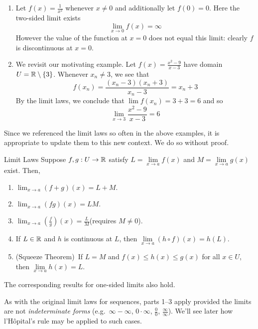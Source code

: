 \begin{examples}{}{}
\begin{enumerate}
	\item Let $f(x)=\frac 1{x^2}$ whenever $x\neq 0$ and additionally let $f(0)=0$. Here the two-sided limit exists
	\[\lim_{x\to 0}f(x)=\infty\]
	However the value of the function at $x=0$ does not equal this limit: clearly $f$ is discontinuous at $x=0$.
	
	\item We revisit our motivating example. Let $f(x)=\frac{x^2-9}{x-3}$ have domain $U=\mathbb{R}\setminus\{3\}$. Whenever $x_n\neq 3$, we see that
	\[f(x_n)=\frac{(x_n-3)(x_n+3)}{x_n-3}=x_n+3\]
	By the limit laws, we conclude that $\lim f(x_n)=3+3=6$ and so
	\[\lim\limits_{x\to 3}\frac{x^2-9}{x-3}=6\]
\end{enumerate}
\end{examples}\vfil\goodbreak

Since we referenced the limit laws so often in the above examples, it is appropriate to update them to this new context. We do so without proof.

\begin{cor}{Limit Laws}{}
Suppose $f,g:U\to\mathbb{R}$ satisfy $L=\lim\limits_{x\to a}f(x)$ and $M=\lim\limits_{x\to a}g(x)$ exist. Then,
\begin{enumerate}
  \item $\displaystyle\lim_{x\to a}(f+g)(x)=L+M$.
  \item $\displaystyle\lim_{x\to a}(fg)(x)=LM$.
  \item $\displaystyle\lim_{x\to a}\left(\frac fg\right)(x)=\frac LM$\quad (requires $M\neq 0$).
	\item If $L\in\mathbb{R}$ and $h$ is continuous at $L$, then $\displaystyle\lim\limits_{x\to a}(h\circ f)(x)=h(L)$.
	\item (Squeeze Theorem)\ If $L=M$ and $f(x)\le h(x)\le g(x)$ for all $x\in U$, then $\lim\limits_{x\to a}h(x)=L$.
\end{enumerate}
The corresponding results for one-sided limits also hold.
\end{cor}

As with the original limit laws for sequences, parts 1--3 apply provided the limits are not \emph{indeterminate forms} (e.g.\ $\infty-\infty$, $0\cdot\infty$, $\frac 00$, $\frac\infty\infty$). We'll see later how l'Hôpital's rule may be applied to such cases.




